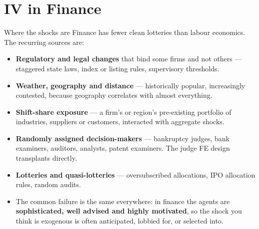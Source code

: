 \documentclass[
  11pt,
  ignorenonframetext,
  aspectratio=169,
]{beamer}
\providecommand{\tightlist}{%
  \setlength{\itemsep}{0pt}\setlength{\parskip}{0pt}}
\begin{document}
\section{IV in Finance}\label{iv-in-finance}

\begin{frame}{Where the shocks are}
\protect{}\label{where-the-shocks-are}
Finance has fewer clean lotteries than labour economics. The recurring
sources are:

\begin{itemize}
\tightlist
\item
  \textbf{Regulatory and legal changes} that bind some firms and not
  others --- staggered state laws, index or listing rules, supervisory
  thresholds.
\item
  \textbf{Weather, geography and distance} --- historically popular,
  increasingly contested, because geography correlates with almost
  everything.
\item
  \textbf{Shift-share exposure} --- a firm's or region's pre-existing
  portfolio of industries, suppliers or customers, interacted with
  aggregate shocks.
\item
  \textbf{Randomly assigned decision-makers} --- bankruptcy judges, bank
  examiners, auditors, analysts, patent examiners. The judge FE design
  transplants directly.
\item
  \textbf{Lotteries and quasi-lotteries} --- oversubscribed allocations,
  IPO allocation rules, random audits.
\end{itemize}

\vspace{0.4em}

\begin{itemize}
\tightlist
\item
  The common failure is the same everywhere: in finance the agents are
  \textbf{sophisticated, well advised and highly motivated}, so the
  shock you think is exogenous is often anticipated, lobbied for, or
  selected into.
\end{itemize}
\end{frame}
\end{document}
